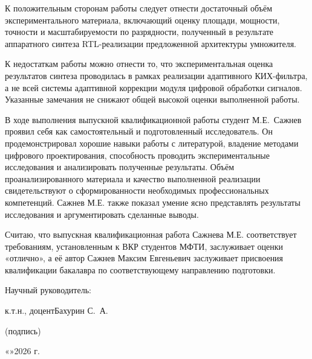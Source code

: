 \documentclass[12pt]{article}
\begin{document}
К положительным сторонам работы следует отнести достаточный объём
экспериментального материала, включающий оценку площади, мощности, точности
и масштабируемости по разрядности, полученный в результате аппаратного
синтеза RTL-реализации предложенной архитектуры умножителя.

К недостаткам работы можно отнести то, что экспериментальная оценка
результатов синтеза проводилась в рамках реализации адаптивного КИХ-фильтра,
а не всей системы адаптивной коррекции модуля цифровой обработки сигналов.
Указанные замечания не снижают общей высокой оценки выполненной работы.

В ходе выполнения выпускной квалификационной работы студент М.Е.~Сажнев
проявил себя как самостоятельный и подготовленный исследователь. Он
продемонстрировал хорошие навыки работы с литературой, владение методами
цифрового проектирования, способность проводить экспериментальные
исследования и анализировать полученные результаты. Объём проанализированного
материала и качество выполненной реализации свидетельствуют о
сформированности необходимых профессиональных компетенций. Сажнев М.Е. также
показал умение ясно представлять результаты исследования и аргументировать
сделанные выводы.

Считаю, что выпускная квалификационная работа Сажнева М.Е. соответствует
требованиям, установленным к ВКР студентов МФТИ, заслуживает оценки
«отлично», а её автор Сажнев Максим Евгеньевич заслуживает присвоения
квалификации бакалавра по соответствующему направлению подготовки.

\bigskip

\noindent Научный руководитель:

\medskip

\noindent к.т.н., доцент\hfill Бахурин С.~А.\hspace{2em}

\smallskip

\noindent\hspace{\dimexpr0.38\textwidth+1cm\relax}(подпись)

\bigskip\bigskip

\noindent «\hspace{2em}»\hspace{4em}2026 г.
\end{document}

